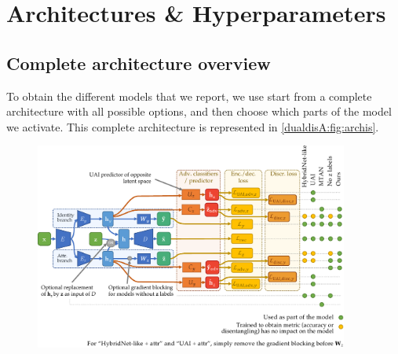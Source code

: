 \section{Architectures \& Hyperparameters} \label{dualdisA:sec:archis_HP}

\subsection{Complete architecture overview}

To obtain the different models that we report, we use start from a complete architecture with all possible options, and then choose which parts of the model we activate. This complete architecture is represented in \autoref{dualdisA:fig:archis}.

\begin{figure}
    \centering
    \includegraphics[width=0.92\textwidth]{images/dualdis_S_archis}
    \label{dualdisA:fig:archis}
\end{figure}

